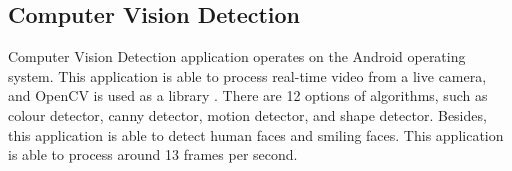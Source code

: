         \subsection{Computer Vision Detection}
            Computer Vision Detection application operates on the Android operating system.
            This application is able to process real-time video from a live camera,
            and OpenCV is used as a library \cite{opencv_library}.
            There are 12 options of algorithms, such as colour detector, canny detector, motion detector, and shape detector.
            Besides, this application is able to detect human faces and smiling faces.
            This application is able to process around 13 frames per second.
